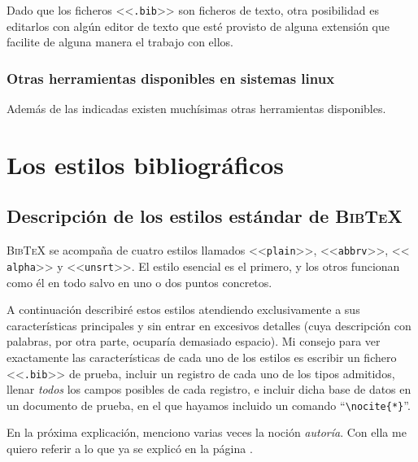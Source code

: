 \documentclass[a4paper,11pt]{article}
\def\btx-{\textsc{Bib\TeX}}
\def\ltr#1-{<<\texttt{#1}>>}
\def\tpf#1-{\ltr.#1-}
\def\cmd#1-{``\texttt{\textbackslash#1}''}
\begin{document}
Dado que  los ficheros \tpf  bib- son ficheros  de texto, otra  posibilidad es
editarlos con algún editor de texto  que esté provisto de alguna extensión que
facilite de alguna manera el trabajo con ellos.

\subsubsection{Otras herramientas disponibles en sistemas linux}
\label{sec:otras-herr-disp}

Además de las indicadas  existen muchísimas otras herramientas disponibles.


\section{Los estilos bibliográficos}
\label{sec:los-estil-bibl}

\subsection{Descripción de los estilos estándar de \btx-}
\label{sec:los-estilos-estandar-1}

\btx- se  acompaña de cuatro estilos  llamados \ltr plain-,  \ltr abbrv-, \ltr
alpha- y \ltr unsrt-.  El estilo esencial es el primero, y los otros funcionan
como él en todo salvo en uno o dos puntos concretos.

A  continuación  describiré  estos  estilos atendiendo  exclusivamente  a  sus
características  principales   y  sin  entrar  en   excesivos  detalles  (cuya
descripción  con palabras,  por otra  parte, ocuparía  demasiado  espacio). Mi
consejo para ver exactamente las características de cada uno de los estilos es
escribir un  fichero \tpf bib- de prueba,  incluir un registro de  cada uno de
los tipos admitidos, llenar \emph{todos} los campos posibles de cada registro,
e incluir  dicha base de datos  en un documento  de prueba, en el  que hayamos
incluido un comando \cmd nocite\{*\}-.

En  la próxima explicación,  menciono varias  veces la  noción \emph{autoría}.
Con  ella   me  quiero  referir  a  lo   que  ya  se  explicó   en  la  página
\pageref{sec:la-autoria-de}.
\end{document}
